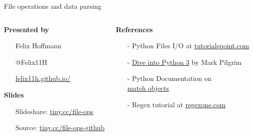 
\begin{frame}[fragile]
  \begin{center} 
    \LARGE File operations and data parsing
  \end{center}
  
  \vspace{0.55cm}

  \begin{columns}[t]
    \begin{column}{0.4\textwidth}        
      \textbf{Presented by}
      \normalsize
      \vspace{0.18cm}
      \begin{itemize}%
        \setlength{\itemindent}{-0.3cm}
        \item[] Felix Hoffmann
        \item[] @Felix11H
        \item[] \href{http://felix11h.github.io/}{felix11h.github.io/}
      \end{itemize}

      \vspace{0.38cm}
      \textbf{Slides}
      \normalsize
      \vspace{0.18cm}
      \begin{itemize}%
        \setlength{\itemindent}{-0.1cm}
        \item[] Slideshare: %
          \href{http://tiny.cc/file-ops}{tiny.cc/file-ops}
        \item[] Source: %
          \href{http://tiny.cc/file-ops-github}{tiny.cc/file-ops-github}
      \end{itemize}
    \end{column}
    \begin{column}{0.64\textwidth}
      \textbf{References}
      \vspace{0.28cm}
      \normalsize 
      \begin{itemize}%
        \itemsep8pt
        \item[-] Python Files I/O at \href{http://www.tutorialspoint.com/python/python_files_io.htm}{tutorialspoint.com}
        \item[-] \href{%
            http://www.diveintopython3.net/regular-expressions.html}{%
              Dive into Python 3} by Mark Pilgrim
        \item[-] Python Documentation on\\
          \href{https://docs.python.org/2/library/re.html#match-objects}{%
            match objects} 
        \item[-] Regex tutorial at \href{http://regexone.com/}{regexone.com}
          

\end{itemize}
\end{column}
\end{columns}
\end{frame}
